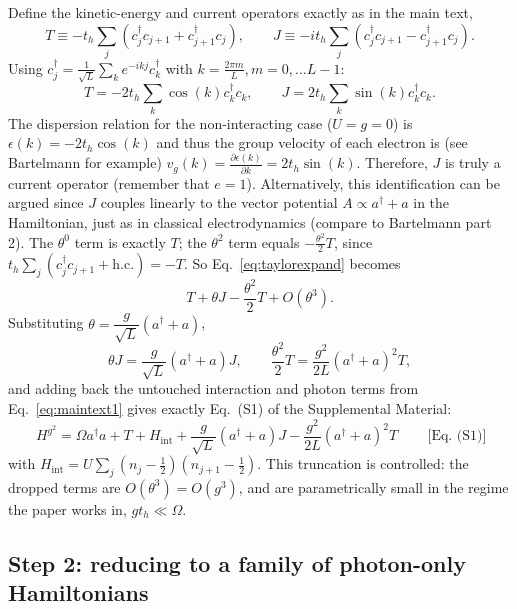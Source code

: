 \documentclass[../../main.tex]{subfiles}
\begin{document}
Define the kinetic-energy and current operators exactly as in the main text,
\begin{equation}
T\equiv-t_h\sum_j\left(c_j^\dagger c_{j+1}+c_{j+1}^\dagger c_j\right),
\qquad
J\equiv-it_h\sum_j\left(c_j^\dagger c_{j+1}-c_{j+1}^\dagger c_j\right).
\end{equation}
Using $c_j^\dagger = \frac{1}{\sqrt{L}}\sum_{k} e^{-ikj} c_k^\dagger$ with $k=\frac{2\pi m}{L}, m=0,\dots L-1$:
\begin{equation}
T=-2t_h\sum_k \cos(k) c_k^\dagger c_k,
\qquad
J=2t_h\sum_k \sin(k) c_k^\dagger c_k.
\end{equation}
The dispersion relation for the non-interacting case ($U=g=0$) is $\epsilon(k) = -2t_h \cos(k)$ and thus the group velocity of each electron is (see Bartelmann for example) $v_g(k) = \frac{\partial \epsilon(k)}{\partial k} = 2t_h \sin(k)$. Therefore, $J$ is truly a current operator (remember that $e=1$). Alternatively, this identification can be argued since $J$ couples linearly to the vector potential $A\propto a^\dagger + a$ in the Hamiltonian, just as in classical electrodynamics (compare to Bartelmann part 2).
The $\theta^0$ term is exactly $T$; the $\theta^2$ term equals
$-\tfrac{\theta^2}{2}T$, since $t_h\sum_j(c_j^\dagger c_{j+1}+\mathrm{h.c.})=-T$.
So Eq.~\eqref{eq:taylorexpand} becomes
\begin{equation}
T+\theta J-\frac{\theta^2}{2}T+O(\theta^3).
\end{equation}
Substituting $\theta=\dfrac{g}{\sqrt L}(a^\dagger+a)$,
\begin{equation}
\theta J=\frac{g}{\sqrt L}(a^\dagger+a)J,\qquad
\frac{\theta^2}{2}T=\frac{g^2}{2L}(a^\dagger+a)^2T,
\end{equation}
and adding back the untouched interaction and photon terms from
Eq.~\eqref{eq:maintext1} gives exactly Eq.~(S1) of the Supplemental Material:
\begin{equation}
\boxed{\,H^{g^2}=\Omega a^\dagger a+T+H_{\mathrm{int}}
+\frac{g}{\sqrt L}(a^\dagger+a)J-\frac{g^2}{2L}(a^\dagger+a)^2T\,}
\qquad\text{[Eq.~(S1)]}
\label{eq:Hg2}
\end{equation}
with $H_{\mathrm{int}}=U\sum_j(n_j-\tfrac12)(n_{j+1}-\tfrac12)$. This
truncation is controlled: the dropped terms are $O(\theta^3)=O(g^3)$, and are
parametrically small in the regime the paper works in, $gt_h\ll\Omega$.

\subsection*{Step 2: reducing to a family of photon-only Hamiltonians}
\label{sec:step2-reduction}
\end{document}
